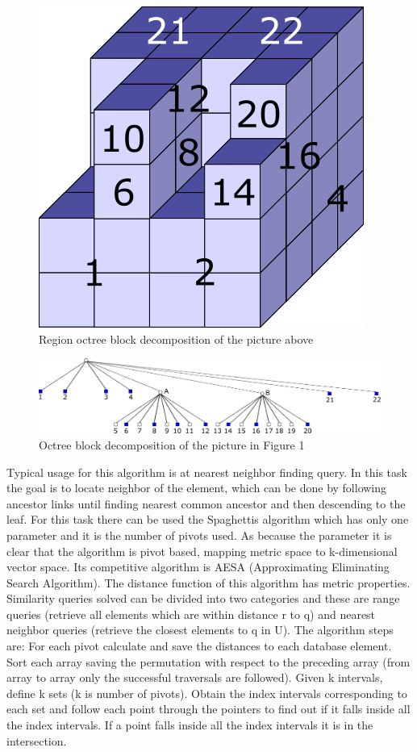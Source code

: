 \begin{figure}
\centering
\includegraphics[scale=0.5]{mat3d_todo_numbered.png}
\caption{Region octree block decomposition of the picture above}
\end{figure}
\begin{figure}
\centering
\includegraphics[width=\textwidth]{mat3d_strom.png}
\caption{Octree block decomposition of the picture in Figure 1}
\end{figure}

Typical usage for this algorithm is at nearest neighbor finding query.
In this task the goal is to locate neighbor of the element, which can be done by following ancestor links until finding nearest common ancestor and then descending to the leaf.
For this task there can be used the Spaghettis algorithm \cite{spaghettis} which has only one parameter and it is the number of pivots used. As because the parameter it is clear that the algorithm is pivot based, mapping metric space to k-dimensional vector space. Its competitive algorithm is AESA (Approximating Eliminating Search Algorithm). The distance function of this algorithm has metric properties. Similarity queries solved can be divided into two categories and these are range queries (retrieve all elements which are within distance r to q) and nearest neighbor queries (retrieve the closest elements to q in U). The algorithm steps are: For each pivot calculate and save the distances to each database element. Sort each array saving the permutation with respect to the preceding array (from array to array only the successful traversals are followed). Given k intervals, define k sets (k is number of pivots). Obtain the index intervals corresponding to each set and follow each point through the pointers to find out if it falls inside all the index intervals. If a point falls inside all the index intervals it is in the intersection.

